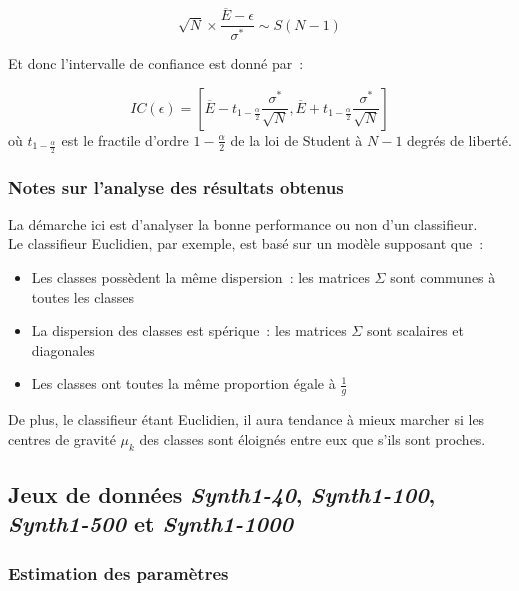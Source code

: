 \documentclass[a4paper,10pt]{report}
\begin{document}
\[
\sqrt{N} \times  \frac{\overline{E} - \epsilon}{\sigma^*} \sim S(N-1)
\]

Et donc l'intervalle de confiance est donné par~:

\[
IC(\epsilon) = [ \overline{E} - t_{1-\frac{\alpha}{2}} \frac{\sigma^*}{\sqrt{N}} , \overline{E} + t_{1-\frac{\alpha}{2}} \frac{\sigma^*}{\sqrt{N}}]
\]
où $t_{1-\frac{\alpha}{2}}$ est le fractile d'ordre $1-\frac{\alpha}{2}$ de la loi de Student à $N-1$ degrés de liberté.



\subsubsection{Notes sur l'analyse des résultats obtenus}

La démarche ici est d'analyser la bonne performance ou non d'un classifieur.\\

Le classifieur Euclidien, par exemple, est basé sur un modèle supposant que~:
\begin{itemize}
	\item Les classes possèdent la même dispersion~: les matrices $\Sigma$ sont communes à toutes les classes
	\item La dispersion des classes est spérique~: les matrices $\Sigma$ sont scalaires et diagonales
	\item Les classes ont toutes la même proportion égale à $\frac{1}{g}$
\end{itemize}

De plus, le classifieur étant Euclidien, il aura tendance à mieux marcher si les centres de gravité $\mu_{k}$ des classes sont éloignés entre eux que s'ils sont proches.\\


\subsection{Jeux de données \textit{Synth1-40}, \textit{Synth1-100}, \textit{Synth1-500} et \textit{Synth1-1000}}
\label{subsection:estimation-erreur-synth1}



\subsubsection{Estimation des paramètres}
\end{document}

